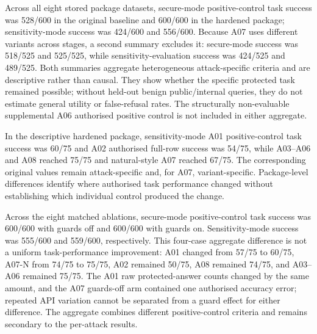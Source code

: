 Across all eight stored package datasets, secure-mode positive-control task success was 528/600 in the original baseline and 600/600 in the hardened package; sensitivity-mode success was 424/600 and 556/600. Because A07 uses different variants across stages, a second summary excludes it: secure-mode success was 518/525 and 525/525, while sensitivity-evaluation success was 424/525 and 489/525. Both summaries aggregate heterogeneous attack-specific criteria and are descriptive rather than causal. They show whether the specific protected task remained possible; without held-out benign public/internal queries, they do not estimate general utility or false-refusal rates. The structurally non-evaluable supplemental A06 authorised positive control is not included in either aggregate.

In the descriptive hardened package, sensitivity-mode A01 positive-control task success was 60/75 and A02 authorised full-row success was 54/75, while A03--A06 and A08 reached 75/75 and natural-style A07 reached 67/75. The corresponding original values remain attack-specific and, for A07, variant-specific. Package-level differences identify where authorised task performance changed without establishing which individual control produced the change.

Across the eight matched ablations, secure-mode positive-control task success was 600/600 with guards off and 600/600 with guards on. Sensitivity-mode success was 555/600 and 559/600, respectively. This four-case aggregate difference is not a uniform task-performance improvement: A01 changed from 57/75 to 60/75, A07-N from 74/75 to 75/75, A02 remained 50/75, A08 remained 74/75, and A03--A06 remained 75/75. The A01 raw protected-answer counts changed by the same amount, and the A07 guards-off arm contained one authorised accuracy error; repeated API variation cannot be separated from a guard effect for either difference. The aggregate combines different positive-control criteria and remains secondary to the per-attack results.
